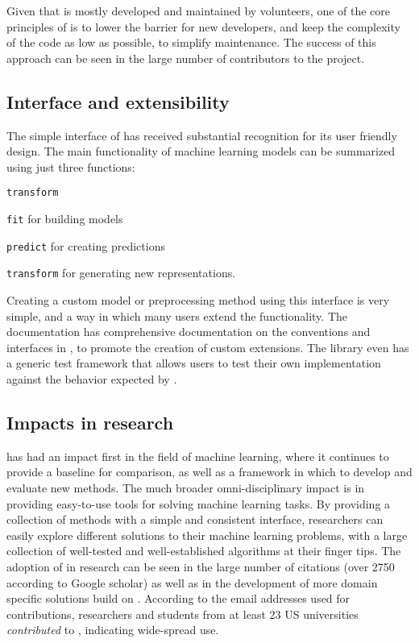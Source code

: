Given that \sklearn{} is mostly developed and maintained by volunteers,
one of the core principles of \sklearn{} is to lower the barrier for new developers,
and keep the complexity of the code as low as possible, to simplify maintenance.
The success of this approach can be seen in the large number of contributors to
the project.

\subsection{Interface and extensibility}
The simple interface of \sklearn{} has received substantial recognition for its user friendly design.
The main functionality of machine learning models can
be summarized using just three functions:
\begin{labeling}{\texttt{transform}}
    \item[\texttt{fit}] for building models
    \item[\texttt{predict}] for creating predictions
    \item[\texttt{transform}] for generating new representations.
\end{labeling}

Creating a custom model or preprocessing method using this interface is very simple,
and a way in which many users extend the functionality. The \sklearn{} documentation
has comprehensive documentation on the conventions and interfaces in \sklearn{},
to promote the creation of custom extensions.
The \sklearn{} library even has a generic test framework that allows users to
test their own implementation against the behavior expected by \sklearn{}.

\subsection{Impacts in research}
\sklearn{} has had an impact first in the field of machine learning,
where it continues to provide a baseline for comparison, as well as a
framework in which to develop and evaluate new methods.
The much broader omni-disciplinary impact is in providing easy-to-use
tools for solving machine learning tasks. By providing a collection
of methods with a simple and consistent interface, researchers
can easily explore different solutions to their machine learning problems,
with a large collection of well-tested and well-established algorithms
at their finger tips.
The adoption of \sklearn{} in research can be seen in the large number
of citations (over 2750 according to Google scholar) as well as in the development
of more domain specific solutions build on \sklearn{}.
According to the email addresses used for contributions, researchers and students
from at least 23 US universities \emph{contributed} to \sklearn{}, indicating wide-spread use.

